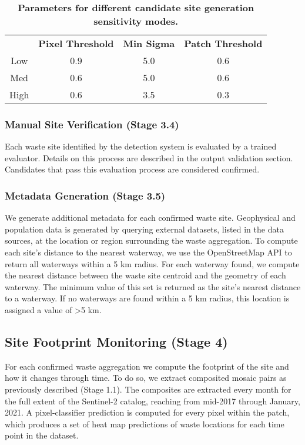 \documentclass[10pt,letterpaper]{article}
\begin{document}
\begin{table}[!ht]
\begin{adjustwidth}{-2.25in}{0in}
    \caption{\textbf{ Parameters for different candidate site generation sensitivity modes.}}
    \label{table:sensitivity_modes}
    \begin{tabular}{ *{4}{c} }
    \toprule &  \textbf{Pixel Threshold} & \textbf{Min Sigma} & \textbf{Patch Threshold}\\
        \cmidrule{2-4}
        Low & 0.9 & 5.0 & 0.6 \\
        Med & 0.6 & 5.0 & 0.6 \\
        High & 0.6 & 3.5 & 0.3 \\
        \bottomrule
    \end{tabular}
    \end{adjustwidth}
\end{table}

\subsubsection*{Manual Site Verification (Stage 3.4)} \label{site_verification}
Each waste site identified by the detection system is evaluated by a trained evaluator. Details on this process are described in the output validation section. Candidates that pass this evaluation process are considered confirmed.

\subsubsection*{Metadata Generation (Stage 3.5)} \label{metadata}
We generate additional metadata for each confirmed waste site. Geophysical and population data is generated by querying external datasets, listed in the data sources, at the location or region surrounding the waste aggregation. To compute each site’s distance to the nearest waterway, we use the OpenStreetMap API to return all waterways within a 5 km radius. For each waterway found, we compute the nearest distance between the waste site centroid and the geometry of each waterway. The minimum value of this set is returned as the site's nearest distance to a waterway. If no waterways are found within a 5 km radius, this location is assigned a value of >5 km.

\subsection*{Site Footprint Monitoring (Stage 4)}
For each confirmed waste aggregation we compute the footprint of the site and how it changes through time. To do so, we extract composited mosaic pairs as previously described (Stage 1.1). The composites are extracted every month for the full extent of the Sentinel-2 catalog, reaching from mid-2017 through January, 2021. A pixel-classifier prediction is computed for every pixel within the patch, which produces a set of heat map predictions of waste locations for each time point in the dataset.
\end{document}
